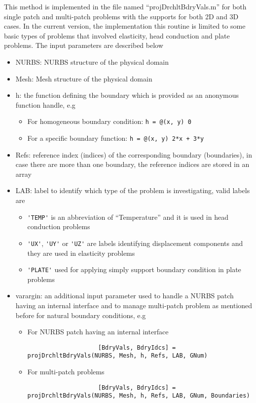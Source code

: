 This method is implemented in the file named ``projDrchltBdryVals.m'' for both single patch and multi-patch problems with the supports for both 2D and 3D cases. In the current version, the implementation this routine is limited to some basic types of problems that involved elasticity, head conduction and plate problems. The input parameters are described below
\begin{itemize}
    \item NURBS: NURBS structure of the physical domain
    \item Mesh: Mesh structure of the physical domain
    \item h: the function defining the boundary which is provided as an anonymous function handle, e.g
    \begin{itemize}
        \item For homogeneous boundary condition: \lstinline{h = @(x, y) 0}
        \item For a specific boundary function: \lstinline{h = @(x, y) 2*x + 3*y}
    \end{itemize}
    \item Refs: reference index (indices) of the corresponding boundary (boundaries), in case there are more than one boundary, the reference indices are stored in an array
    \item LAB: label to identify which type of the problem is investigating, valid labels are
        \begin{itemize}
          \item \lstinline{'TEMP'} is an abbreviation of ``Temperature'' and it is used in head conduction problems
          \item \lstinline{'UX'}, \lstinline[columns=fixed]{'UY'} or \lstinline[columns=fixed]{'UZ'} are labels identifying displacement components and they are used in elasticity problems
          \item \lstinline{'PLATE'} used for applying simply support boundary condition in plate problems
        \end{itemize}
    \item varargin: an additional input parameter used to handle a NURBS patch having an internal interface and to manage multi-patch problem as mentioned before for natural boundary conditions, e.g
        \begin{itemize}
            \item For NURBS patch having an internal interface
                \begin{lstlisting}
                    [BdryVals, BdryIdcs] = projDrchltBdryVals(NURBS, Mesh, h, Refs, LAB, GNum)
                \end{lstlisting}
            \item For multi-patch problems
                \begin{lstlisting}
                    [BdryVals, BdryIdcs] = projDrchltBdryVals(NURBS, Mesh, h, Refs, LAB, GNum, Boundaries)
                \end{lstlisting}
        \end{itemize}
\end{itemize}
